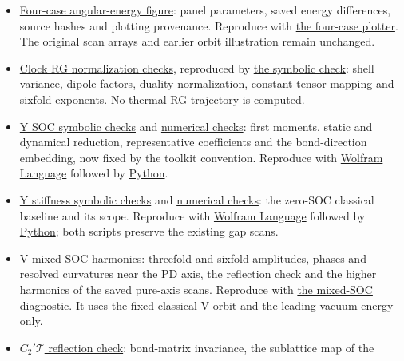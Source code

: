 \begin{itemize}
  calculation.
\item
  \href{../../../data-space/verification/260917-clock-matching/four-case-figure.json}{Four-case
  angular-energy figure}: panel parameters, saved energy differences,
  source hashes and plotting provenance. Reproduce with
  \href{../../../examples/nbcp_clock_matching_figures.py}{the
  four-case plotter}. The original scan arrays and earlier orbit
  illustration remain unchanged.
\item
  \href{../../../data-space/verification/260917-clock-rg/clock-rg-check.json}{Clock
  RG normalization checks}, reproduced by
  \href{../../../examples/nbcp_clock_rg_checks.py}{the
  symbolic check}: shell variance, dipole factors, duality
  normalization, constant-tensor mapping and sixfold exponents. No
  thermal RG trajectory is computed.
\item
  \href{../../../data-space/verification/260917-y-soc-conditions/symbolic-soc-check.json}{Y
  SOC symbolic checks} and
  \href{../../../data-space/verification/260917-y-soc-conditions/soc-conditions-check.json}{numerical
  checks}: first moments, static and dynamical reduction, representative
  coefficients and the bond-direction embedding, now fixed by the
  toolkit convention. Reproduce
  with
  \href{../../../examples/nbcp_y_soc_conditions.wl}{Wolfram
  Language} followed by
  \href{../../../examples/nbcp_y_soc_conditions.py}{Python}.
\item
  \href{../../../data-space/verification/260917-y-stiffness/symbolic-check.json}{Y
  stiffness symbolic checks} and
  \href{../../../data-space/verification/260917-y-stiffness/stiffness-check.json}{numerical
  checks}: the zero-SOC classical baseline and its scope. Reproduce with
  \href{../../../examples/nbcp_y_stiffness.wl}{Wolfram
  Language} followed by
  \href{../../../examples/nbcp_y_stiffness.py}{Python};
  both scripts preserve the existing gap scans.
\item
  \href{../../../data-space/verification/261001-v-mixed-soc/v-mixed-soc-check.json}{V
  mixed-SOC harmonics}: threefold and sixfold amplitudes, phases and
  resolved curvatures near the PD axis, the reflection check and the
  higher harmonics of the saved pure-axis scans. Reproduce with
  \href{../../../examples/nbcp_v_mixed_soc.py}{the mixed-SOC
  diagnostic}. It uses the fixed classical V orbit and the leading
  vacuum energy only.
\item
  \href{../../../data-space/verification/261001-c2t-reflection/c2t-reflection-check.json}{\(C_2'\mathcal T\)
  reflection check}: bond-matrix invariance, the sublattice map of the

\end{itemize}
